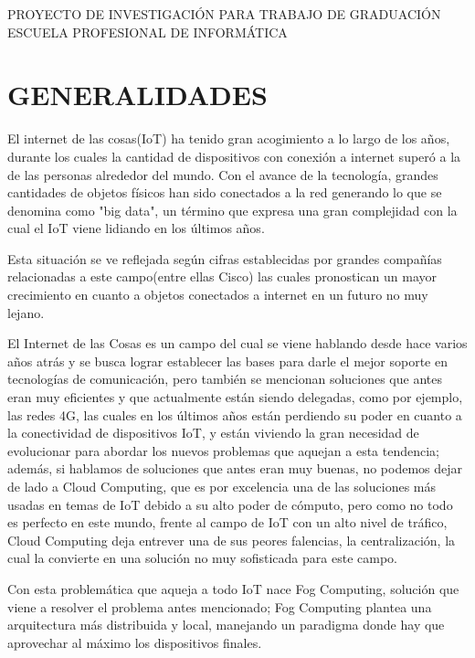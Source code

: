 \begin{center}
    \Large {PROYECTO DE INVESTIGACIÓN PARA TRABAJO DE GRADUACIÓN \\
    \vskip 0.2cm
     ESCUELA PROFESIONAL DE INFORMÁTICA}
\end{center}
\vskip 1cm

\section{GENERALIDADES}
El internet de las cosas(IoT) ha tenido gran acogimiento a lo largo de los años, durante los cuales la cantidad de dispositivos con conexión a internet superó a la de las personas alrededor del mundo. Con el avance de la tecnología, grandes cantidades de objetos físicos han sido conectados a la red generando lo que se denomina como "big data", un término que expresa una gran complejidad con la cual el IoT viene lidiando en los últimos años.\par
\vskip 0.3cm
Esta situación se ve reflejada según cifras establecidas por grandes compañías relacionadas a este campo(entre ellas Cisco) las cuales pronostican un mayor crecimiento en cuanto a objetos conectados a internet en un futuro no muy lejano.\par
\vskip 0.3cm
El Internet de las Cosas es un campo del cual se viene hablando desde hace varios años atrás y se busca lograr establecer las bases para darle el mejor soporte en tecnologías de comunicación, pero también se mencionan soluciones que antes eran muy eficientes y que actualmente están siendo delegadas, como por ejemplo, las redes 4G, las cuales en los últimos años están perdiendo su poder en cuanto a la conectividad de dispositivos IoT, y están viviendo la gran necesidad de evolucionar para abordar los nuevos problemas que aquejan a esta tendencia; además, si hablamos de soluciones que antes eran muy buenas, no podemos dejar de lado a Cloud Computing, que es por excelencia una de las soluciones más usadas en temas de IoT debido a su alto poder de cómputo, pero como no todo es perfecto en este mundo, frente al campo de IoT con un alto nivel de tráfico, Cloud Computing deja entrever una de sus peores falencias, la centralización, la cual la convierte en una solución no muy sofisticada para este campo.\par
\vskip 0.3cm
Con esta problemática que aqueja a todo IoT nace Fog Computing, solución que viene a resolver el problema antes mencionado; Fog Computing plantea una arquitectura más distribuida y local, manejando un paradigma donde hay que aprovechar al máximo los dispositivos finales.\par
